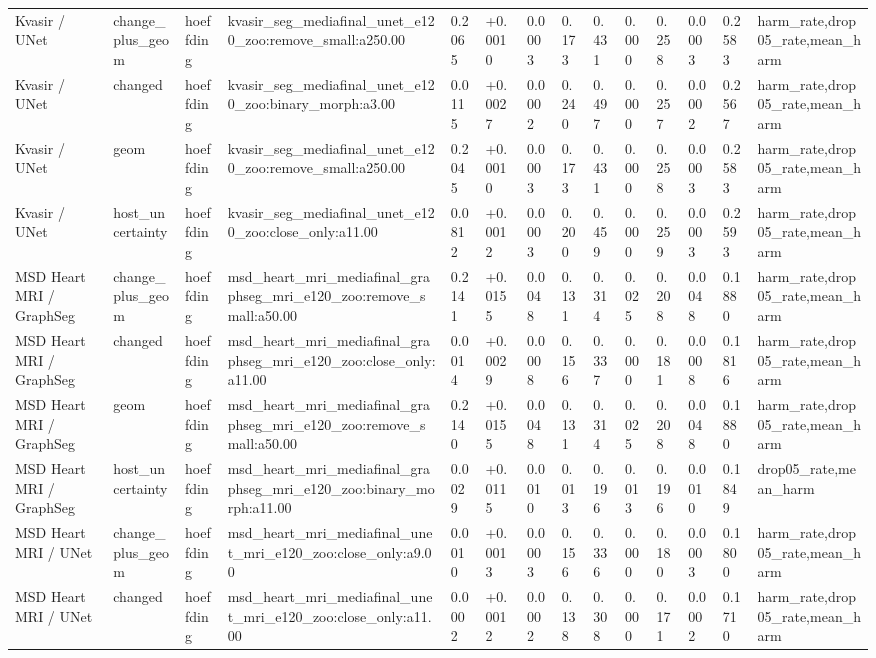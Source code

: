 \begin{table}[t]
\begin{tabular}{llllllllllllll}
Kvasir / UNet & change\_plus\_geom & hoeffding & kvasir\_seg\_mediafinal\_unet\_e120\_zoo:remove\_small:a250.00 & 0.2065 & +0.0010 & 0.0003 & 0.173 & 0.431 & 0.000 & 0.258 & 0.0003 & 0.2583 & harm\_rate,drop05\_rate,mean\_harm \\
Kvasir / UNet & changed & hoeffding & kvasir\_seg\_mediafinal\_unet\_e120\_zoo:binary\_morph:a3.00 & 0.0115 & +0.0027 & 0.0002 & 0.240 & 0.497 & 0.000 & 0.257 & 0.0002 & 0.2567 & harm\_rate,drop05\_rate,mean\_harm \\
Kvasir / UNet & geom & hoeffding & kvasir\_seg\_mediafinal\_unet\_e120\_zoo:remove\_small:a250.00 & 0.2045 & +0.0010 & 0.0003 & 0.173 & 0.431 & 0.000 & 0.258 & 0.0003 & 0.2583 & harm\_rate,drop05\_rate,mean\_harm \\
Kvasir / UNet & host\_uncertainty & hoeffding & kvasir\_seg\_mediafinal\_unet\_e120\_zoo:close\_only:a11.00 & 0.0812 & +0.0012 & 0.0003 & 0.200 & 0.459 & 0.000 & 0.259 & 0.0003 & 0.2593 & harm\_rate,drop05\_rate,mean\_harm \\
MSD Heart MRI / GraphSeg & change\_plus\_geom & hoeffding & msd\_heart\_mri\_mediafinal\_graphseg\_mri\_e120\_zoo:remove\_small:a50.00 & 0.2141 & +0.0155 & 0.0048 & 0.131 & 0.314 & 0.025 & 0.208 & 0.0048 & 0.1880 & harm\_rate,drop05\_rate,mean\_harm \\
MSD Heart MRI / GraphSeg & changed & hoeffding & msd\_heart\_mri\_mediafinal\_graphseg\_mri\_e120\_zoo:close\_only:a11.00 & 0.0014 & +0.0029 & 0.0008 & 0.156 & 0.337 & 0.000 & 0.181 & 0.0008 & 0.1816 & harm\_rate,drop05\_rate,mean\_harm \\
MSD Heart MRI / GraphSeg & geom & hoeffding & msd\_heart\_mri\_mediafinal\_graphseg\_mri\_e120\_zoo:remove\_small:a50.00 & 0.2140 & +0.0155 & 0.0048 & 0.131 & 0.314 & 0.025 & 0.208 & 0.0048 & 0.1880 & harm\_rate,drop05\_rate,mean\_harm \\
MSD Heart MRI / GraphSeg & host\_uncertainty & hoeffding & msd\_heart\_mri\_mediafinal\_graphseg\_mri\_e120\_zoo:binary\_morph:a11.00 & 0.0029 & +0.0115 & 0.0010 & 0.013 & 0.196 & 0.013 & 0.196 & 0.0010 & 0.1849 & drop05\_rate,mean\_harm \\
MSD Heart MRI / UNet & change\_plus\_geom & hoeffding & msd\_heart\_mri\_mediafinal\_unet\_mri\_e120\_zoo:close\_only:a9.00 & 0.0010 & +0.0013 & 0.0003 & 0.156 & 0.336 & 0.000 & 0.180 & 0.0003 & 0.1800 & harm\_rate,drop05\_rate,mean\_harm \\
MSD Heart MRI / UNet & changed & hoeffding & msd\_heart\_mri\_mediafinal\_unet\_mri\_e120\_zoo:close\_only:a11.00 & 0.0002 & +0.0012 & 0.0002 & 0.138 & 0.308 & 0.000 & 0.171 & 0.0002 & 0.1710 & harm\_rate,drop05\_rate,mean\_harm \\

\end{tabular}
\end{table}

